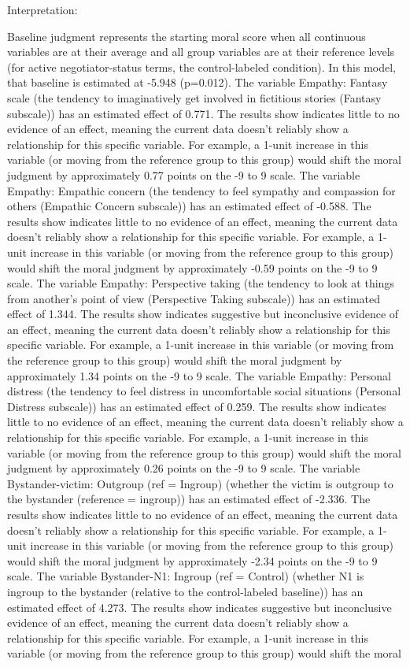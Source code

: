 \documentclass[11pt]{article}
\begin{document}
Interpretation:

Baseline judgment represents the starting moral score when all continuous variables are at their average and all group variables are at their reference levels (for active negotiator-status terms, the control-labeled condition). In this model, that baseline is estimated at -5.948 (p=0.012). The variable Empathy: Fantasy scale (the tendency to imaginatively get involved in fictitious stories (Fantasy subscale)) has an estimated effect of 0.771. The results show indicates little to no evidence of an effect, meaning the current data doesn't reliably show a relationship for this specific variable. For example, a 1-unit increase in this variable (or moving from the reference group to this group) would shift the moral judgment by approximately 0.77 points on the -9 to 9 scale. The variable Empathy: Empathic concern (the tendency to feel sympathy and compassion for others (Empathic Concern subscale)) has an estimated effect of -0.588. The results show indicates little to no evidence of an effect, meaning the current data doesn't reliably show a relationship for this specific variable. For example, a 1-unit increase in this variable (or moving from the reference group to this group) would shift the moral judgment by approximately -0.59 points on the -9 to 9 scale. The variable Empathy: Perspective taking (the tendency to look at things from another's point of view (Perspective Taking subscale)) has an estimated effect of 1.344. The results show indicates suggestive but inconclusive evidence of an effect, meaning the current data doesn't reliably show a relationship for this specific variable. For example, a 1-unit increase in this variable (or moving from the reference group to this group) would shift the moral judgment by approximately 1.34 points on the -9 to 9 scale. The variable Empathy: Personal distress (the tendency to feel distress in uncomfortable social situations (Personal Distress subscale)) has an estimated effect of 0.259. The results show indicates little to no evidence of an effect, meaning the current data doesn't reliably show a relationship for this specific variable. For example, a 1-unit increase in this variable (or moving from the reference group to this group) would shift the moral judgment by approximately 0.26 points on the -9 to 9 scale. The variable Bystander-victim: Outgroup (ref = Ingroup) (whether the victim is outgroup to the bystander (reference = ingroup)) has an estimated effect of -2.336. The results show indicates little to no evidence of an effect, meaning the current data doesn't reliably show a relationship for this specific variable. For example, a 1-unit increase in this variable (or moving from the reference group to this group) would shift the moral judgment by approximately -2.34 points on the -9 to 9 scale. The variable Bystander-N1: Ingroup (ref = Control) (whether N1 is ingroup to the bystander (relative to the control-labeled baseline)) has an estimated effect of 4.273. The results show indicates suggestive but inconclusive evidence of an effect, meaning the current data doesn't reliably show a relationship for this specific variable. For example, a 1-unit increase in this variable (or moving from the reference group to this group) would shift the moral 
\end{document}
